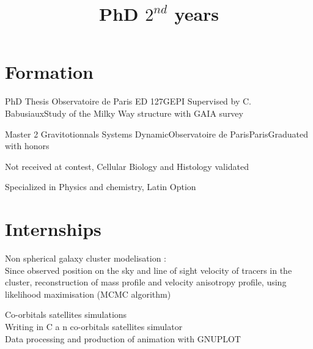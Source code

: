 \documentclass{moderncv}
\title{PhD $2^{nd}$ years}
\begin{document}
\maketitle

\section{Formation}

 {PhD Thesis} {Observatoire de Paris ED 127}{GEPI}
{Supervised by C. Babusiaux}{Study of the Milky Way structure with GAIA survey}

 {Master 2 Gravitotionnals Systems Dynamic}{Observatoire de Paris}{Paris}{}{Graduated with honors}



{Not received at contest, Cellular Biology and Histology validated}

{Specialized in Physics and chemistry, Latin Option}

\section{Internships}

{Non spherical galaxy cluster modelisation :\\
Since observed position on the sky and line of sight velocity of tracers in the cluster, reconstruction of mass profile and velocity anisotropy profile, using likelihood maximisation (MCMC algorithm)}



{Co-orbitals satellites simulations \\
  Writing in C a n co-orbitals satellites simulator
  \\Data processing and production of animation with GNUPLOT}
\end{document}
